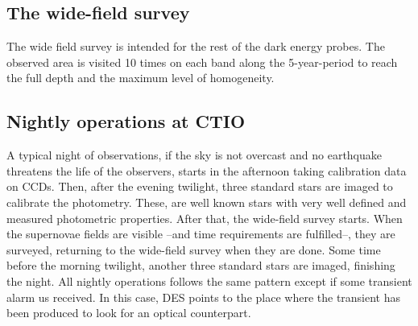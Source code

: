 \subsection*{The wide-field survey}
The wide field survey is intended for the rest of the dark energy probes. The observed area is visited 10 times on each band along the 5-year-period to reach the full depth and the maximum level of homogeneity.
\subsection*{Nightly operations at CTIO}
A typical night of observations, if the sky is not overcast and no earthquake threatens the life of the observers, starts in the afternoon taking calibration data on CCDs. Then, after the evening twilight, three standard stars are imaged to calibrate the photometry. These, are well known stars with very well defined and measured photometric properties. After that, the wide-field survey starts. When the supernovae fields are visible --and time requirements are fulfilled--, they are surveyed, returning to the wide-field survey when they are done. Some time before the morning twilight, another three standard stars are imaged, finishing the night. All nightly operations follows the same pattern except if some transient alarm us received. In this case,  DES points to the place where the transient has been produced to look for an optical counterpart.

